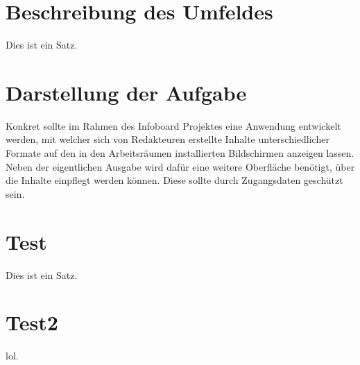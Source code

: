 \documentclass[a4paper, 11pt]{article}
\begin{document}
\tableofcontents
\newpage



\section{Beschreibung des Umfeldes}

Dies ist ein Satz.

\section{Darstellung der Aufgabe}

Konkret sollte im Rahmen des Infoboard Projektes eine Anwendung entwickelt werden, mit welcher sich von Redakteuren erstellte Inhalte unterschiedlicher Formate auf den in den Arbeitsräumen installierten Bildschirmen anzeigen lassen. Neben der eigentlichen Ausgabe wird dafür eine weitere Oberfläche benötigt, über die Inhalte einpflegt werden können. Diese sollte durch Zugangsdaten geschützt sein.

\section{Test}

Dies ist ein Satz.

\section{Test2}

lol.


\end{document}
